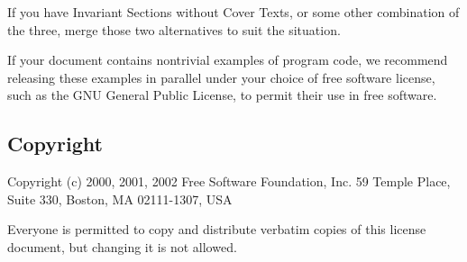 {\tiny{}If you have Invariant Sections without Cover Texts, or some
other combination of the three, merge those two alternatives to suit
the situation.}{\tiny\par}

{\tiny{}If your document contains nontrivial examples of program code,
we recommend releasing these examples in parallel under your choice
of free software license, such as the GNU General Public License,
to permit their use in free software.}{\tiny\par}

\subsection*{{\tiny{}Copyright }}

{\tiny{}Copyright (c) 2000, 2001, 2002 Free Software Foundation, Inc.
59 Temple Place, Suite 330, Boston, MA 02111-1307, USA}{\tiny\par}

{\tiny{}Everyone is permitted to copy and distribute verbatim copies
of this license document, but changing it is not allowed.}{\tiny\par}
